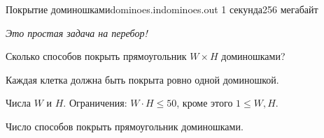 %
%
%

\begin{problem}{Покрытие доминошками}{dominoes.in}{dominoes.out}
{1 секунда}{256 мегабайт}{}

\emph{Это простая задача на перебор!}

Сколько способов покрыть прямоугольник $W \times H$ доминошками?

Каждая клетка должна быть покрыта ровно одной доминошкой.

\InputFile

Числа $W$ и $H$. Ограничения: $W \cdot H \le 50$, кроме этого $1 \le W, H$.

\OutputFile

Число способов покрыть прямоугольник доминошками.

\Example

\begin{example}
%
\end{example}
\end{problem}
